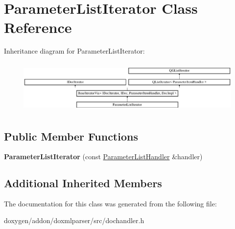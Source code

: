\hypertarget{class_parameter_list_iterator}{}\section{Parameter\+List\+Iterator Class Reference}
\label{class_parameter_list_iterator}
Inheritance diagram for Parameter\+List\+Iterator\+:\begin{figure}[H]
\begin{center}
\leavevmode
\includegraphics[height=2.666667cm]{class_parameter_list_iterator}
\end{center}
\end{figure}
\subsection*{Public Member Functions}
\begin{DoxyCompactItemize}
\item 
\mbox{\label{class_parameter_list_iterator_a23008e23ef5f72723d4dd8590e1dc945}} 
{\bfseries Parameter\+List\+Iterator} (const \mbox{\hyperlink{class_parameter_list_handler}{Parameter\+List\+Handler}} \&handler)
\end{DoxyCompactItemize}
\subsection*{Additional Inherited Members}


The documentation for this class was generated from the following file\+:\begin{DoxyCompactItemize}
\item 
doxygen/addon/doxmlparser/src/dochandler.\+h\end{DoxyCompactItemize}

